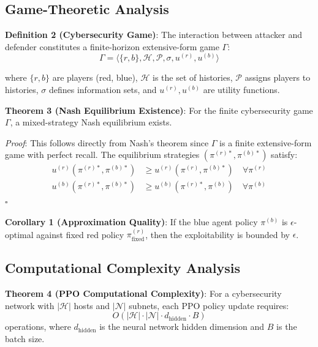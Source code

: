 \documentclass[12pt,oneside]{article}
\begin{document}
\subsection{Game-Theoretic Analysis}

\textbf{Definition 2 (Cybersecurity Game)}: The interaction between attacker and defender constitutes a finite-horizon extensive-form game $\Gamma$:
\begin{equation}
\Gamma = \langle \{r,b\}, \mathcal{H}, \mathcal{P}, \sigma, u^{(r)}, u^{(b)} \rangle
\end{equation}

where $\{r,b\}$ are players (red, blue), $\mathcal{H}$ is the set of histories, $\mathcal{P}$ assigns players to histories, $\sigma$ defines information sets, and $u^{(r)}, u^{(b)}$ are utility functions.

\textbf{Theorem 3 (Nash Equilibrium Existence)}: For the finite cybersecurity game $\Gamma$, a mixed-strategy Nash equilibrium exists.

\textit{Proof}: This follows directly from Nash's theorem since $\Gamma$ is a finite extensive-form game with perfect recall. The equilibrium strategies $(\pi^{(r)*}, \pi^{(b)*})$ satisfy:
\begin{align}
u^{(r)}(\pi^{(r)*}, \pi^{(b)*}) &\geq u^{(r)}(\pi^{(r)}, \pi^{(b)*}) \quad \forall \pi^{(r)} \\
u^{(b)}(\pi^{(r)*}, \pi^{(b)*}) &\geq u^{(b)}(\pi^{(r)*}, \pi^{(b)}) \quad \forall \pi^{(b)}
\end{align}
$\square$

\textbf{Corollary 1 (Approximation Quality)}: If the blue agent policy $\pi^{(b)}$ is $\epsilon$-optimal against fixed red policy $\pi^{(r)}_{\text{fixed}}$, then the exploitability is bounded by $\epsilon$.

\subsection{Computational Complexity Analysis}

\textbf{Theorem 4 (PPO Computational Complexity)}: For a cybersecurity network with $|\mathcal{H}|$ hosts and $|\mathcal{N}|$ subnets, each PPO policy update requires:
\begin{equation}
O(|\mathcal{H}| \cdot |\mathcal{N}| \cdot d_{\text{hidden}} \cdot B)
\end{equation}
operations, where $d_{\text{hidden}}$ is the neural network hidden dimension and $B$ is the batch size.
\end{document}
